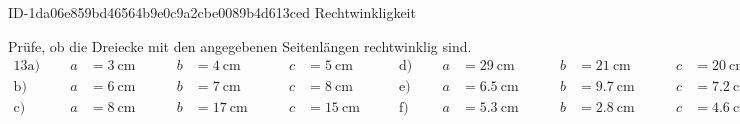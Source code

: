 \begin{exercise}
      {ID-1da06e859bd46564b9e0c9a2cbe0089b4d613ced}
      {Rechtwinkligkeit}
  \ifproblem\problem\par
    Prüfe, ob die Dreiecke mit den angegebenen
    Seitenlängen rechtwinklig sind.
    \begingroup
      \newcommand{\tri}[4]
      {%
        \text{#1}\;&\;
        &
        a&=\SI{#2}{\centi\metre}
        &
        \;&\;
        &
        b&=\SI{#3}{\centi\metre}
        &
        \;&\;
        &
        c&=\SI{#4}{\centi\metre}
      }%
      \begin{alignat*}{13}
        \tri{a)}{3}{4}{5}
        \quad&\quad
        \tri{d)}{29}{21}{20}
        \\
        \tri{b)}{6}{7}{8}
        \quad&\quad
        \tri{e)}{6.5}{9.7}{7.2}
        \\
        \tri{c)}{8}{17}{15}
        \quad&\quad
        \tri{f)}{5.3}{2.8}{4.6}
      \end{alignat*}
    \endgroup
  \fi
\end{exercise}
